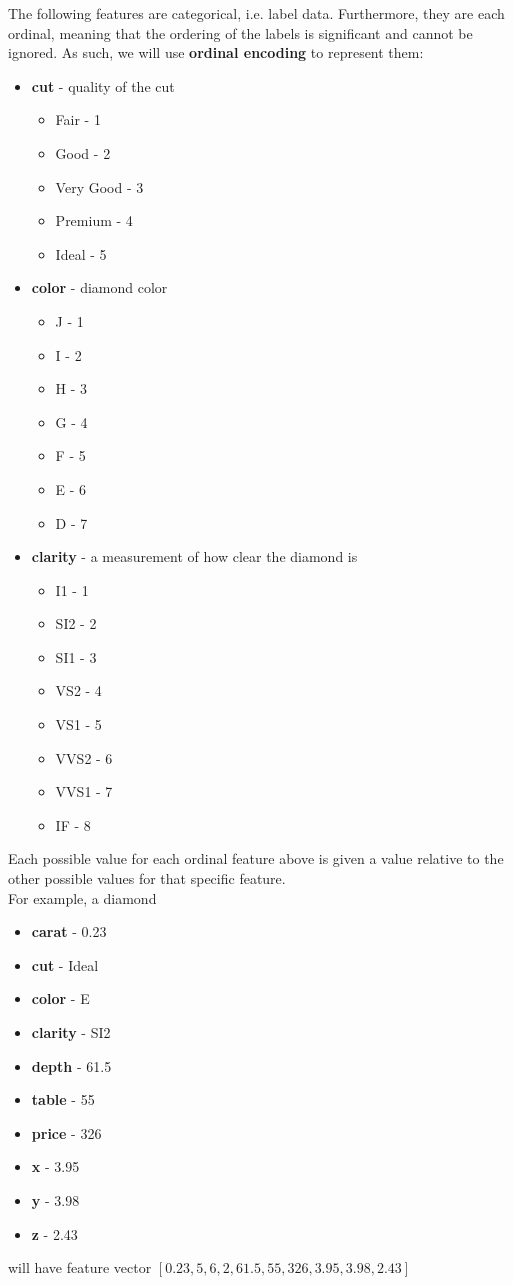 \documentclass[a4paper, 12pt]{article}
\begin{document}
The following features are categorical, i.e. label data. Furthermore, they are each ordinal, meaning that the ordering of the labels is significant and cannot be ignored. As such, we will use \textbf{ordinal encoding} to represent them:
\begin{itemize}
\item
\textbf{cut} - quality of the cut
\begin{itemize}
\item
Fair - 1
\item
Good - 2
\item
Very Good - 3
\item
Premium - 4
\item
Ideal - 5
\end{itemize}

\item
\textbf{color} - diamond color
\begin{itemize}
\item
J - 1
\item
I - 2
\item
H - 3
\item
G - 4
\item
F - 5
\item
E - 6
\item
D - 7
\end{itemize}

\item
\textbf{clarity} - a measurement of how clear the diamond is
\begin{itemize}
\item
I1 - 1
\item
SI2 - 2
\item
SI1 - 3
\item
VS2 - 4
\item
VS1 - 5
\item
VVS2 - 6
\item
VVS1 - 7
\item
IF - 8
\end{itemize}
\end{itemize} 

Each possible value for each ordinal feature above is given a value relative to the other possible values for that specific feature.\\

For example, a diamond
\begin{itemize}
\item
\textbf{carat} - 0.23
\item
\textbf{cut} - Ideal
\item
\textbf{color} - E
\item
\textbf{clarity} - SI2
\item
\textbf{depth} - 61.5
\item
\textbf{table} - 55
\item
\textbf{price} - 326
\item
\textbf{x} - 3.95
\item
\textbf{y} - 3.98
\item
\textbf{z} - 2.43

\end{itemize}

will have feature vector $[0.23, 5, 6, 2, 61.5, 55, 326, 3.95, 3.98, 2.43]$
\end{document}
